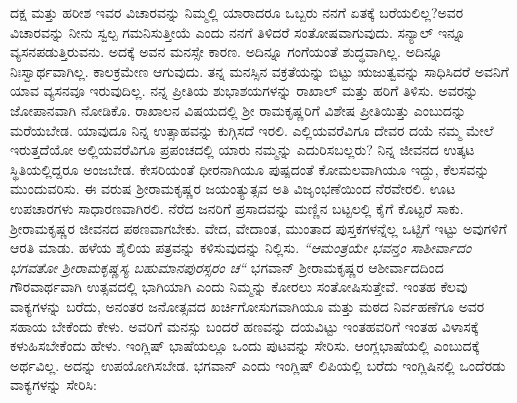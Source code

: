 ದಕ್ಷ ಮತ್ತು ಹರೀಶ ಇವರ ವಿಚಾರವನ್ನು ನಿಮ್ಮಲ್ಲಿ ಯಾರಾದರೂ ಒಬ್ಬರು ನನಗೆ ಏತಕ್ಕೆ ಬರೆಯಲಿಲ್ಲ?ಅವರ ವಿಚಾರವನ್ನು ನೀನು ಸ್ವಲ್ಪ ಗಮನಿಸುತ್ತೀಯೆ ಎಂದು ನನಗೆ ತಿಳಿದರೆ ಸಂತೋಷವಾಗುವುದು. ಸನ್ಯಾಲ್ ಇನ್ನೂ ವ್ಯಸನಪಡುತ್ತಿರುವನು. ಅದಕ್ಕೆ ಅವನ ಮನಸ್ಸೇ ಕಾರಣ. ಅದಿನ್ನೂ ಗಂಗೆಯಂತೆ ಶುದ್ಧವಾಗಿಲ್ಲ. ಅದಿನ್ನೂ ನಿಃಸ್ವಾರ್ಥವಾಗಿಲ್ಲ. ಕಾಲಕ್ರಮೇಣ ಆಗುವುದು. ತನ್ನ ಮನಸ್ಸಿನ ವಕ್ರತೆಯನ್ನು ಬಿಟ್ಟು ಋಜುತ್ವವನ್ನು ಸಾಧಿಸಿದರೆ ಅವನಿಗೆ ಯಾವ ವ್ಯಸನವೂ ಇರುವುದಿಲ್ಲ. ನನ್ನ ಪ್ರೀತಿಯ ಶುಭಾಶಯಗಳನ್ನು ರಾಖಾಲ್ ಮತ್ತು ಹರಿಗೆ ತಿಳಿಸು. ಅವರನ್ನು ಜೋಪಾನವಾಗಿ ನೋಡಿಕೊ. ರಾಖಾಲನ ವಿಷಯದಲ್ಲಿ ಶ‍್ರೀ ರಾಮಕೃಷ್ಣರಿಗೆ ವಿಶೇಷ ಪ್ರೀತಿಯಿತ್ತು ಎಂಬುದನ್ನು ಮರೆಯಬೇಡ. ಯಾವುದೂ ನಿನ್ನ ಉತ್ಸಾಹವನ್ನು ಕುಗ್ಗಿಸದೆ ಇರಲಿ. ಎಲ್ಲಿಯವರೆವಿಗೂ ದೇವರ ದಯೆ ನಮ್ಮ ಮೇಲೆ ಇರುತ್ತದೆಯೋ ಅಲ್ಲಿಯವರೆವಿಗೂ ಪ್ರಪಂಚದಲ್ಲಿ ಯಾರು ನಮ್ಮನ್ನು ಎದುರಿಸಬಲ್ಲರು? ನಿನ್ನ ಜೀವನದ ಉತ್ಕಟ ಸ್ಥಿತಿಯಲ್ಲಿದ್ದರೂ ಅಂಜಬೇಡ. ಕೇಸರಿಯಂತೆ ಧೀರನಾಗಿಯೂ ಪುಷ್ಪದಂತೆ ಕೋಮಲವಾಗಿಯೂ ಇದ್ದು, ಕೆಲಸವನ್ನು ಮುಂದುವರಿಸು. ಈ ವರುಷ ಶ‍್ರೀರಾಮಕೃಷ್ಣರ ಜಯಂತ್ಯುತ್ಸವ ಅತಿ ವಿಜೃಂಭಣೆಯಿಂದ ನೆರವೇರಲಿ. ಊಟ ಉಪಚಾರಗಳು ಸಾಧಾರಣವಾಗಿರಲಿ. ನೆರೆದ ಜನರಿಗೆ ಪ್ರಸಾದವನ್ನು ಮಣ್ಣಿನ ಬಟ್ಟಲಲ್ಲಿ ಕೈಗೆ ಕೊಟ್ಟರೆ ಸಾಕು. ಶ‍್ರೀರಾಮಕೃಷ್ಣರ ಜೀವನದ ಪಠಣವಾಗಬೇಕು. ವೇದ, ವೇದಾಂತ, ಮುಂತಾದ ಪುಸ್ತಕಗಳನ್ನೆಲ್ಲ ಒಟ್ಟಿಗೆ ಇಟ್ಟು ಅವುಗಳಿಗೆ ಆರತಿ ಮಾಡು. ಹಳೆಯ ಶೈಲಿಯ ಪತ್ರವನ್ನು ಕಳಿಸುವುದನ್ನು ನಿಲ್ಲಿಸು. \textit{ “ಆಮಂತ್ರಯೇ ಭವನ್ತಂ ಸಾಶೀರ್ವಾದಂ ಭಗವತೋ ಶ‍್ರೀರಾಮಕೃಷ್ಣಸ್ಯ ಬಹುಮಾನಪುರಸ್ಸರಂ ಚ“}\enginline{-} ಭಗವಾನ್ ಶ‍್ರೀರಾಮಕೃಷ್ಣರ ಆಶೀರ್ವಾದದಿಂದ ಗೌರವಾರ್ಥವಾಗಿ ಉತ್ಸವದಲ್ಲಿ ಭಾಗಿಯಾಗಿ ಎಂದು ನಿಮ್ಮನ್ನು ಕೋರಲು ಸಂತೋಷಿಸುತ್ತೇವೆ. ಇಂತಹ ಕೆಲವು ವಾಕ್ಯಗಳನ್ನು ಬರೆದು, ಅನಂತರ ಜನೋತ್ಸವದ ಖರ್ಚಿಗೋಸುಗವಾಗಿಯೂ ಮತ್ತು ಮಠದ ನಿರ್ವಹಣೆಗೂ ಅವರ ಸಹಾಯ ಬೇಕೆಂದು ಕೇಳು. ಅವರಿಗೆ ಮನಸ್ಸು ಬಂದರೆ ಹಣವನ್ನು ದಯವಿಟ್ಟು ಇಂತಹವರಿಗೆ ಇಂತಹ ವಿಳಾಸಕ್ಕೆ ಕಳುಹಿಸಬೇಕೆಂದು ಹೇಳು. ಇಂಗ್ಲಿಷ್ ಭಾಷೆಯಲ್ಲೂ ಒಂದು ಪುಟವನ್ನು ಸೇರಿಸು. ಆಂಗ್ಲಭಾಷೆಯಲ್ಲಿ  ಎಂಬುದಕ್ಕೆ ಅರ್ಥವಿಲ್ಲ. ಅದನ್ನು ಉಪಯೋಗಿಸಬೇಡ. ಭಗವಾನ್ ಎಂದು ಇಂಗ್ಲಿಷ್ ಲಿಪಿಯಲ್ಲಿ ಬರೆದು ಇಂಗ್ಲಿಷಿನಲ್ಲಿ ಒಂದೆರಡು ವಾಕ್ಯಗಳನ್ನು ಸೇರಿಸಿ:


\noindent
{}


\vspace{-0.4cm}

\begin{flushright}
\end{flushright}

